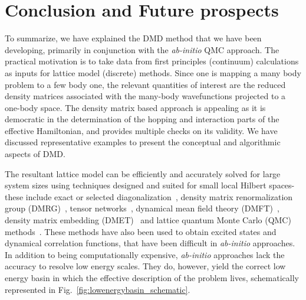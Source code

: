 \section{Conclusion and Future prospects}
To summarize, we have explained the DMD method that we have been developing, primarily in conjunction with the 
\emph{ab-initio} QMC approach. The practical motivation is to take data from first principles (continuum) 
calculations as inputs for lattice model (discrete) methods. 
Since one is mapping a many body problem to a few body one, the relevant quantities of interest are 
the reduced density matrices associated with the many-body wavefunctions projected to a one-body space. 
The density matrix based approach is appealing as it is democratic 
in the determination of the hopping and interaction parts of the effective Hamiltonian, and provides multiple 
checks on its validity. We have discussed representative examples to present the conceptual and algorithmic aspects of DMD. 

The resultant lattice model can be efficiently and accurately solved for large system sizes using techniques designed and suited for small local Hilbert spaces- these include exact or selected diagonalization~\cite{DeRaedt,Tubman_selci,Holmes_Tubman_Umrigar}, density matrix renormalization group (DMRG)~\cite{White1992}, tensor networks~\cite{PEPS,Changlani_CPS,NeuscammanCPS}, dynamical mean field theory (DMFT)~\cite{Kotliar2006}, density matrix embedding (DMET)~\cite{DMET_2012} and lattice quantum Monte Carlo (QMC) methods~\cite{Scalapino, Trivedi_Ceperley, Zhang_AFQMC, Sandvik_loops, Prokofiev, Booth2009,SQMC,Holmes_Changlani_Umrigar, Booth2013}. 
These methods have also been used to obtain excited states and dynamical correlation functions, that have been difficult in \textit{ab-initio} approaches. 
In addition to being computationally expensive, \textit{ab-initio} approaches lack the accuracy to resolve low energy scales. 
They do, however, yield the correct low energy basin in which the effective description of the problem lives, schematically represented in Fig.~\ref{fig:lowenergybasin_schematic}.


